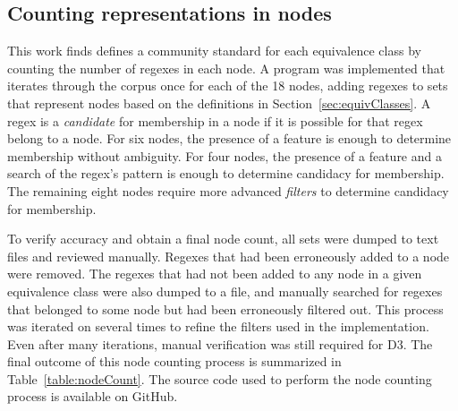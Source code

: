 \subsection{Counting representations in nodes}
\label{sec:nodeCountOverview}

This work finds defines a community standard for each equivalence class by counting the number of regexes in each node.  A program was implemented that iterates through the corpus once for each of the 18 nodes, adding regexes to sets that represent nodes based on the definitions in Section~\ref{sec:equivClasses}.  A regex is a \emph{candidate} for membership in a node if it is possible for that regex belong to a node.  For six nodes, the presence of a feature is enough to determine membership without ambiguity.  For four nodes, the presence of a feature and a search of the regex's pattern is enough to determine candidacy for membership.  The remaining eight nodes require more advanced \emph{filters} to determine candidacy for membership.

To verify accuracy and obtain a final node count, all sets were dumped to text files and reviewed manually. Regexes that had been erroneously added to a node were removed.  The regexes that had not been added to any node in a given equivalence class were also dumped to a file, and manually searched for regexes that belonged to some node but had been erroneously filtered out.  This process was iterated on several times to refine the filters used in the implementation.  Even after many iterations, manual verification was still required for D3. The final outcome of this node counting process is summarized in Table~\ref{table:nodeCount}.  The source code used to perform the node counting process is available on GitHub.
